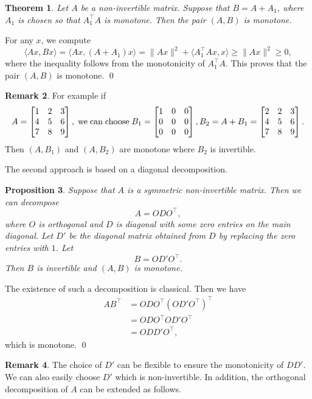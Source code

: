 \documentclass[11pt]{article}
\makeatletter
\renewenvironment{proof}[1][\proofname]{\par
	\normalfont
	\topsep0\p@\@plus3\p@ \trivlist
	\item[\hskip\labelsep\itshape
	#1\@addpunct{.}]\ignorespaces
}{%
	\qed\endtrivlist
}
\newtheorem{theorem}{Theorem}[section]
\newtheorem{proposition}[theorem]{Proposition}
\theoremstyle{definition}
\theoremstyle{definition}
\theoremstyle{definition}
\newtheorem{remark}[theorem]{Remark}
\makeatother
\begin{document}
{
\begin{theorem}\label{thm:3.6}
Let \(A\) be a non-invertible matrix. Suppose that \(B=A+A_1\), where \(A_1\) is chosen so that \(A_1^{\top}A\) is monotone. Then the pair \((A,B)\) is monotone.
\end{theorem}
}
{
\begin{proof}
For any \(x\), we compute
\[
\langle Ax, Bx\rangle
= \langle Ax, (A+A_1)x\rangle
= \|Ax\|^2 + \langle A_1^{\top}Ax, x\rangle
\ge \|Ax\|^2
\ge 0,
\]
where the inequality follows from the monotonicity of \(A_1^{\top}A\). This proves that the pair \((A,B)\) is monotone.
\end{proof}
}
\begin{remark}
{ For example if 
$$A =\begin{bmatrix} 1 & 2 & 3\\ 4 & 5 & 6 \\ 7 & 8 & 9\end{bmatrix}, \;{\rm we \;can\; choose}\; 
B_1 =\begin{bmatrix} 1 & 0 & 0\\ 0 & 0 & 0 \\ 0 & 0 & 0\end{bmatrix}, B_2 =A+B_1=\begin{bmatrix} 2 & 2 & 3\\ 4 & 5 & 6 \\ 7 & 8 & 9\end{bmatrix}. $$
Then $(A,B_1)$ and $(A,B_2)$ are monotone where $B_2$ is invertible.
}
\end{remark}

 The second approach is based on a diagonal decomposition.  

\begin{proposition}
\label{prop:3.1}
Suppose that $A$ is a symmetric non-invertible matrix. Then we can decompose 
\[
A = O D O^\top,
\] 
where $O$ is orthogonal and $D$ is diagonal with some zero entries on the main diagonal. Let $D'$ be the diagonal matrix obtained from $D$ by replacing the zero entries with $1$. Let 
\[
B = O D' O^\top.
\] 
Then $B$ is invertible and $(A,B)$ is monotone.
\end{proposition}

\begin{proof}
The existence of such a decomposition is classical. Then we have
\begin{align*}
AB^\top &= O D O^\top (O D' O^\top)^\top \\
        &= O D O^\top O D' O^\top \\
        &= O D D' O^\top,
\end{align*} 
which is monotone.
\end{proof} 
\begin{remark}
\label{rem:3.2}
The choice of $D'$ can be flexible to ensure the monotonicity of $D D'$. We can also easily choose $D'$ which is non-invertible. In addition, the orthogonal decomposition of $A$ can be extended  as follows.
\end{remark}
\end{document}
